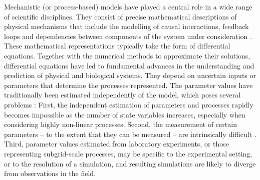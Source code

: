 
Mechanistic (or process-based) models have played a central role in a wide range of scientific disciplines. 
They consist of precise mathematical descriptions of physical mechanisms that include the modelling of causal interactions, feedback loops and dependencies between components of the system under consideration \cite{rackauckas2020universal}. 
These mathematical representations typically take the form of differential equations. 
Together with the numerical methods to approximate their solutions, differential equations have led to fundamental advances in the understanding and prediction of physical and biological systems.
They depend on uncertain inputs or parameters that determine the processes represented. 
The parameter values have traditionally been estimated independently of the model, which poses several problems \cite{hartig2012}:
First, the independent estimation of parameters and processes rapidly becomes impossible as the number of state variables increases, especially when considering highly non-linear processes. 
Second, the measurement of certain parameters -- to the extent that they can be measured -- are intrinsically difficult \cite{Schartau2017}. 
Third, parameter values estimated from laboratory experiments, or those representing subgrid-scale processes, may be specific to the experimental setting, or to the resolution of a simulation, and resulting simulations are likely to diverge from observations in the field.

